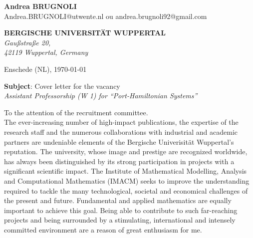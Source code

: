 \documentclass[11pt]{letter}
\begin{document}
	\sffamily
	\begin{flushleft}
		{\bfseries Andrea \textsc{BRUGNOLI}}\\[.35ex]
		Andrea.BRUGNOLI@utwente.nl ou andrea.brugnoli92@gmail.com
	\end{flushleft}
	\begin{flushright}
		{\bfseries BERGISCHE UNIVERSITÄT WUPPERTAL}\\[.35ex]
		\small\itshape
		Gau{\ss}stra{\ss}e 20,  \\
		42119 Wuppertal, Germany
	\end{flushright}
	\begin{flushright}
		Enschede (NL), \today 
	\end{flushright}
	\textbf{Subject}: Cover letter for the vacancy\\
	\textit{Assistant Professorship (W 1) for “Port-Hamiltonian Systems”}
	
	
	To the attention of the recruitment committee.\\
	
	The ever-increasing number of high-impact publications, the expertise of the research staff and the numerous collaborations with industrial and academic partners are undeniable elements of the Bergische Univerisit\"{a}t Wuppertal's reputation. The university, whose image and prestige are recognized worldwide, has always been distinguished by its strong participation in projects with a significant scientific impact. The Institute of Mathematical Modelling, Analysis and Computational Mathematics (IMACM) seeks to improve the understanding required to tackle the many technological, societal and economical challenges of the present and future. Fundamental and applied mathematics are equally important to achieve this goal. Being able to contribute to such far-reaching projects and being surrounded by a stimulating, international and intensely committed environment are a reason of great enthusiasm for me.
	
\end{document}
